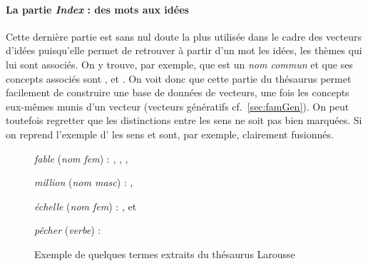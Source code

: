 \paragraph{La partie \emph{Index} : des mots aux idées}
\label{sec:thes-index}

Cette dernière partie est sans nul doute la plus utilisée dans le
cadre des vecteurs d'idées puisqu'elle permet de retrouver à partir
d'un mot les idées, les thèmes qui lui sont associés. On y trouve, par
exemple, que  est un \emph{nom commun} et que ses
concepts associés sont ,  et
. On voit donc que cette partie du thésaurus permet
facilement de construire une base de données de vecteurs, une fois les
concepts eux-mêmes munis d'un vecteur (vecteurs génératifs
cf.~\ref{sec:famGen}). On peut toutefois regretter que les
distinctions entre les sens ne soit pas bien marquées. Si on reprend
l'exemple d' les sens  et
 sont, par exemple, clairement fusionnés.

\begin{center}
  \begin{figure}%
    
    \emph{fable} (\emph{nom fem}) : , ,
    , 
    
    \emph{million} (\emph{nom masc}) : ,
    
    \emph{échelle} (\emph{nom fem}) : , 
    et 
    
    \emph{pêcher} (\emph{verbe}) : 

 \caption{Exemple de quelques termes extraits du thésaurus Larousse
   \cite{Thesaurus1992}}
  \end{figure}
\end{center}


